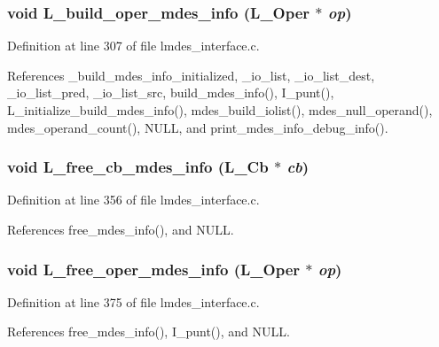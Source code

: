 \subsubsection{\setlength{\rightskip}{0pt plus 5cm}void L\_\-build\_\-oper\_\-mdes\_\-info (L\_\-Oper $\ast$ {\em op})}\label{lmdes__interface_8h_63a7bbae5be233d1ecd8e767e686f6b5}




Definition at line 307 of file lmdes\_\-interface.c.

References \_\-build\_\-mdes\_\-info\_\-initialized, \_\-io\_\-list, \_\-io\_\-list\_\-dest, \_\-io\_\-list\_\-pred, \_\-io\_\-list\_\-src, build\_\-mdes\_\-info(), I\_\-punt(), L\_\-initialize\_\-build\_\-mdes\_\-info(), mdes\_\-build\_\-iolist(), mdes\_\-null\_\-operand(), mdes\_\-operand\_\-count(), NULL, and print\_\-mdes\_\-info\_\-debug\_\-info().
\subsubsection{\setlength{\rightskip}{0pt plus 5cm}void L\_\-free\_\-cb\_\-mdes\_\-info (L\_\-Cb $\ast$ {\em cb})}\label{lmdes__interface_8h_78e2d3c1739cb67e8a13e5bdf9130233}




Definition at line 356 of file lmdes\_\-interface.c.

References free\_\-mdes\_\-info(), and NULL.
\subsubsection{\setlength{\rightskip}{0pt plus 5cm}void L\_\-free\_\-oper\_\-mdes\_\-info (L\_\-Oper $\ast$ {\em op})}\label{lmdes__interface_8h_16b54b93a47c58b6f32309b486b937be}




Definition at line 375 of file lmdes\_\-interface.c.

References free\_\-mdes\_\-info(), I\_\-punt(), and NULL.